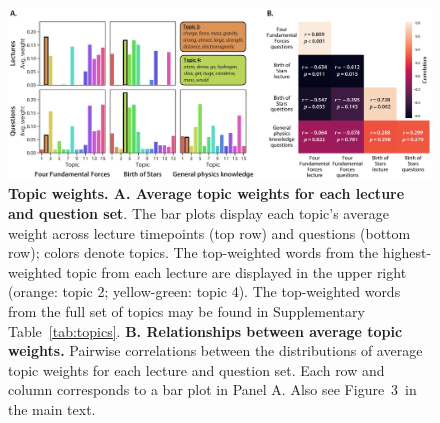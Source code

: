 \documentclass[10pt]{article}
\newcommand{\topicVariability}{3}
\begin{document}
\begin{figure}[tp]
    \includegraphics[width=\textwidth]{figs/topic-weights}

    \caption{\textbf{Topic weights. A. Average topic weights for each lecture and
    question set}. The bar plots display each topic's average weight across
    lecture timepoints (top row) and questions (bottom row); colors denote topics.
    The top-weighted words from the highest-weighted topic from each lecture are
    displayed in the upper right (orange: topic 2; yellow-green: topic 4). The
    top-weighted words from the full set of topics may be found in Supplementary
    Table~\ref{tab:topics}. \textbf{B. Relationships between average topic
    weights.} Pairwise correlations between the distributions of average topic
    weights for each lecture and question set. Each row and column corresponds
    to a bar plot in Panel A. Also see Figure~\topicVariability~in the main text.}

    \label{fig:topics}
\end{figure}
\end{document}
